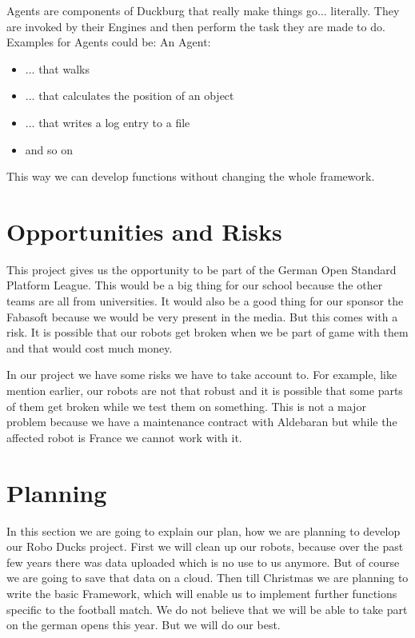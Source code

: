\documentclass[12pt]{article}
\theoremstyle{definition}
\begin{document}
Agents are components of Duckburg that really make things go... literally. They are invoked by their Engines and then perform the task they are made to do. Examples for Agents could be: An Agent:
\begin{itemize}
\item ... that walks
\item ... that calculates the position of an object 
\item ... that writes a log entry to a file
\item and so on
\end{itemize}
This way we can develop functions without changing the whole framework.\linebreak

\pagebreak
\section{Opportunities and Risks}

This project gives us the opportunity to be part of the German Open Standard Platform League. This would be a big thing for our school because the other teams are all from universities. It would also be a good thing for our sponsor the Fabasoft because we would be very present in the media. But this comes with a risk. It is possible that our robots get broken when we be part of game with them and that would cost much money.\newline



In our project we have some risks we have to take account to. For example, like mention earlier, our robots are not that robust and it is possible that some parts of them get broken while we test them on something. This is not a major problem because we have a maintenance contract with Aldebaran but while the affected robot is France we cannot work with it.  


\pagebreak
\section{Planning}

In this section we are going to explain our plan, how we are planning to develop our Robo Ducks project. First we will clean up our robots, because over the past few years there was data uploaded which is no use to us anymore. But of course we are going to save that data on a cloud. 
Then till Christmas we are planning to write the basic Framework, which will enable us to implement further functions specific to the football match. We do not believe that we will be able to take part on the german opens this year. But we will do our best. \newline
\end{document}
